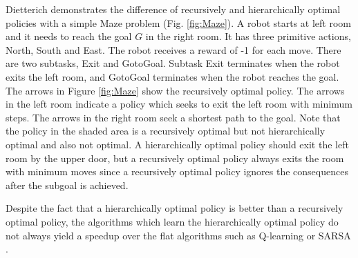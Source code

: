 Dietterich \cite{MaxQJ} demonstrates the difference of recursively and hierarchically optimal policies 
with a simple Maze problem (Fig. \ref{fig:Maze}). A robot starts at left room and it needs to reach 
the goal $G$ in the right room. It has three primitive actions, North, South and East.  
The robot receives a reward of -1 for each move.
There are two subtasks, Exit and GotoGoal. Subtask Exit terminates when the robot exits the left room,
and GotoGoal terminates when the robot reaches the goal. The arrows in Figure \ref{fig:Maze} show the 
recursively optimal policy. The arrows in the left room indicate a policy which seeks to exit
the left room with minimum steps. The arrows in the right room seek a shortest path to the goal.
Note that the policy in the shaded area is a recursively optimal but not hierarchically optimal and also not
optimal. A hierarchically optimal policy should exit the left room by the upper door, but a recursively 
optimal policy always exits the room with minimum moves since
a recursively optimal policy ignores the consequences after the subgoal is achieved. 

Despite the fact that a hierarchically optimal policy is better than a recursively optimal policy, 
the algorithms which learn the hierarchically optimal policy do not always yield a speedup over
the flat algorithms such as Q-learning or SARSA \cite{MaxQJ, Andre02}. 



